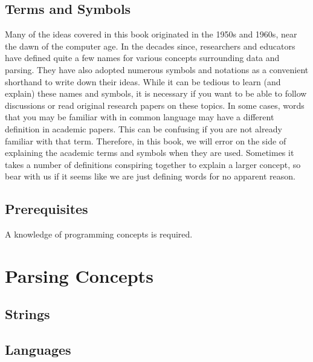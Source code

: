 \documentclass{book}
\begin{document}
\section*{Terms and Symbols}
Many of the ideas covered in this book originated in the 1950s and 
1960s, near the dawn of the computer age. In the decades since,
researchers and educators have defined quite a few names for various
concepts surrounding data and parsing. They have also adopted numerous
symbols and notations as a convenient shorthand to write down their ideas.
While it can be tedious to learn (and explain) these names and symbols, it
is necessary if you want to be able to follow discussions or read
original research papers on these topics. In some cases, words that you may
be familiar with in common language may have a different definition in 
academic papers. This can be confusing if you are not already familiar with
that term. Therefore, in this book, we will error on the side of explaining
the academic terms and symbols when they are used. Sometimes it takes a 
number of definitions conspiring together to explain a larger concept, so
bear with us if it seems like we are just defining words for no apparent
reason.

\section*{Prerequisites}
A knowledge of programming concepts is required.

\setcounter{tocdepth}{4}
\setcounter{secnumdepth}{4}
\tableofcontents

\mainmatter



%
%
\chapter{Parsing Concepts}\label{chpar}

\section{Strings}

\section{Languages}
\end{document}

